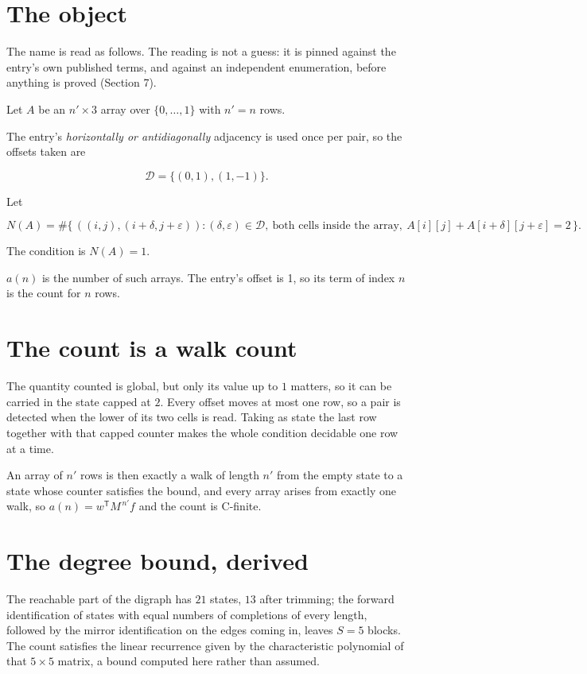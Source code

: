 \documentclass[11pt]{article}
\theoremstyle{definition}
\begin{document}
\section{The object}

The name is read as follows. The reading is not a guess: it is pinned against the entry's own published terms, and against an independent enumeration, before anything is proved (Section 7).

Let $A$ be an $n' \times 3$ array over $\{0,\dots,1\}$ with $n' = n$ rows.

The entry's {\itshape horizontally or antidiagonally} adjacency is used once per pair, so the offsets taken are

\[\mathcal{D} = \{(0,1), (1,-1)\}.\]

Let

\[N(A) = \#\bigl\{\,((i,j),(i{+}\delta,j{+}\varepsilon)) : (\delta,\varepsilon) \in \mathcal{D},\ \text{both cells inside the array},\ A[i][j] + A[i{+}\delta][j{+}\varepsilon] = 2\,\bigr\}.\]

The condition is $N(A) = 1$.

$a(n)$ is the number of such arrays. The entry's offset is 1, so its term of index $n$ is the count for $n$ rows.

\section{The count is a walk count}

The quantity counted is global, but only its value up to $1$ matters, so it can be carried in the state capped at $2$. Every offset moves at most one row, so a pair is detected when the lower of its two cells is read. Taking as state the last row together with that capped counter makes the whole condition decidable one row at a time.

An array of $n'$ rows is then exactly a walk of length $n'$ from the empty state to a state whose counter satisfies the bound, and every array arises from exactly one walk, so $a(n) = w^{\mathsf T}M^{\,n'}f$ and the count is C-finite.

\section{The degree bound, derived}

The reachable part of the digraph has $21$ states, $13$ after trimming; the forward identification of states with equal numbers of completions of every length, followed by the mirror identification on the edges coming in, leaves $S = 5$ blocks. The count satisfies the linear recurrence given by the characteristic polynomial of that $5\times5$ matrix, a bound computed here rather than assumed.
\end{document}
